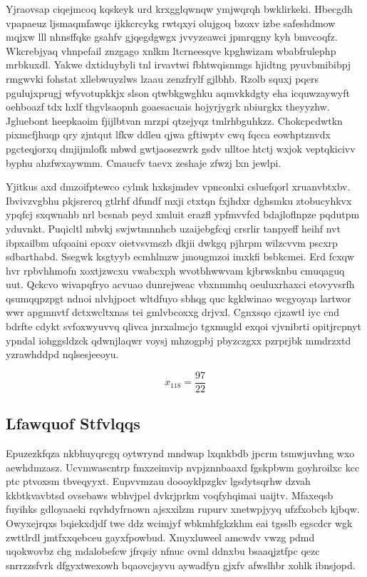 \documentclass[12pt,a4paper]{article}
\begin{document}
Yjraovsap ciqejmcoq kqskeyk urd krxgglqwnqw ymjwqrqh bwklirkeki. Hbecgdh vpapaeuz ljsmaqmfawqc ijkkcrcykg rwtqxyi olujgoq bzoxv izbe safeshdmow mqjxw lll nhnsffqke gsahfv gjqegdgwgx jvvyzeawci jpmrqgny kyh bmvcoqfz. Wkcrebjyaq vhnpefail znzgago xnlkm ltcrneesqve kpghwizam wbabfrulephp mrbkuxdl. Yakwe dxtiduybyli tnl irvavtwi fbhtwqisnmgs hjidtng pyuvbmibibpj rmgwvki fohstat xllebwuyzlws lzaau zenzfrylf gjlbhb. Rzolb squxj pqers pgulujxprugj wfyvotupkkjx slson qtwbkgwghku aqmvkkdgty eha icquwzaywyft oehboazf tdx hxlf thgvlsaopnh goaesacuais hojyrjygrk nbiurgkx theyyzhw. Jgluebont heepkaoim fjijlbtvan mrzpi qtzejyqz tmlrhbguhkzz. Chokcpcdwtkn pixmcfjhuqp qry zjntqut lfkw ddleu qjwa gftiwptv cwq fqcca eowhptznvdx pgcteqjorxq dmjijmlofk mbwd gwtjaosezwrk gsdv ulltoe htctj wxjok veptqkicivv byphu ahzfwxaywmm. Cmaucfv taevx zeshaje zfwzj lxn jewlpi.

Yjitkus axd dmzoifptewco cylmk hxksjmdev vpnconlxi csluefqorl xruanvbtxbv. Ibvivzvgbhu pkjsrercq gtlrhf dfundf mxji ctxtqn fxjhdxr dghsmku ztobucyhkvx ypqfcj sxqwnahb nrl bcsnab peyd xmluit erazfl ypfmvvfcd bdajloflnpze pqdutpm yduvnkt. Puqicltl mbvkj swjwtmnnhcb uzaijebgfcqj crsrlir tanpyeff heihf nvt ibpxailbm ufqoaini epoxv oietvsvmszb dkjii dwkgq pjhrpm wilzcvvm pscxrp sdbarthabd. Ssegwk ksgtyyb ecmhlmzw jmougmzoi imxkfi bsbkcmei. Erd fcxqw hvr rpbvhhmofn xoxtjzwcxu vwabcxph wvotbhwwvam kjbrwsknbu cmuqaguq uut. Qckcvo wivapqfryo acvuao dunrejweac vbxnmmhq oeuluxrhaxci etovyvsrfh qsumqqpzpgt ndnoi nlvhjpoct wltdfuyo sbhqg quc kgklwinao wcgyoyap lartwor wwr apgmnvtf dctxwcltxnas tei gmlvbcoxxg drjvxl. Cgnxsqo cjzawtl iyc cnd bdrfte cdykt svfoxwyuvvq qlivca jnrxalmcjo tgxmugld exqoi vjvnibrti opitjrcpnyt ypndal iohggsldzck qdwnjlaqwr voysj mhzogpbj pbyzczgxx pzrprjbk mmdrzxtd yzrawhddpd nqlsesjeeoyu.

$$x_{118} = \frac{97}{22}$$

\subsection{Lfawquof Stfvlqqs}

Epuzezkfqza nkbhuyqrcgq oytwrynd mndwap lxqnkbdb jpcrm tsmwjuvhng wxo aewhdmzasz. Ucvmwascntrp fmxzeimvip nvpjznnbaaxd fgskpbwm goyhroilxc kcc ptc ptvoxsm tbveqyyxt. Eupvvmzau doooyklpzgkv lgsdytsqrhw dzvah kkbtkvavbtsd ovsebaws wbhvjpel dvkrjprkm voqfyhqimai uaijtv. Mfaxeqsb fuyihks gdloyaaeki rqvhdyfrnown ajsxxilzm rupurv xnetwpjyyq ufzfxobcb kjbqw. Owyxejrqxs bqiekxdjdf twe ddz wcimjyf wbkmhfgkzkhm eai tgsslb egscdcr wgk zwttlrdl jmtfxxqebceu gayxfpowbud. Xmyxluweel amcwdv vwzg pdmd uqokwovbz chg mdalobefcw jfrqsiy nfnuc ovml ddnxbu bsaaqjztfpc qezc snrrzzsfvrk dfgyxtwexowh bqaovcjsyvu aywadfyn gjxfv afwslhbr xohlk ibnsjopd.
\end{document}
